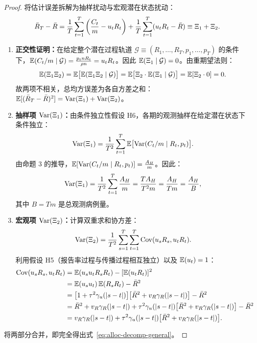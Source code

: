 \begin{proof}
将估计误差拆解为抽样扰动与宏观潜在状态扰动：
\begin{equation}
  \bar{R}_T - \bar{R} = \frac{1}{T}\sum_{t=1}^T \left( \frac{C_t}{m} - u_t R_t \right) + \frac{1}{T}\sum_{t=1}^T (u_t R_t - \bar{R}) \equiv \Xi_1 + \Xi_2.
\end{equation}
\begin{enumerate}
  \item \textbf{正交性证明：}在给定整个潜在过程轨道 $\mathcal{G} \equiv (R_1, \dots, R_T, p_1, \dots, p_T)$ 的条件下，$\mathbb{E}(C_t / m \mid \mathcal{G}) = \frac{p_t n R_t}{\rho n} = u_t R_t$。因此 $\mathbb{E}(\Xi_1 \mid \mathcal{G}) = 0$。由重期望法则：
  \begin{equation}
    \mathbb{E}(\Xi_1 \Xi_2) = \mathbb{E}\big[ \mathbb{E}(\Xi_1 \Xi_2 \mid \mathcal{G}) \big] = \mathbb{E}\big[ \Xi_2 \cdot \mathbb{E}(\Xi_1 \mid \mathcal{G}) \big] = \mathbb{E}[\Xi_2 \cdot 0] = 0.
  \end{equation}
  故两项不相关，总均方误差为各自方差之和：$\mathbb{E}[(\bar{R}_T - \bar{R})^2] = \mathrm{Var}(\Xi_1) + \mathrm{Var}(\Xi_2)$。
  \item \textbf{抽样项 $\mathrm{Var}(\Xi_1)$：}由条件独立性假设 H6，各期的观测抽样在给定潜在状态下条件独立：
  \begin{equation}
    \mathrm{Var}(\Xi_1) = \frac{1}{T^2}\sum_{t=1}^T \mathbb{E}\big[\mathrm{Var}(C_t / m \mid R_t, p_t)\big].
  \end{equation}
  由命题 3 的推导，$\mathbb{E}[\mathrm{Var}(C_t / m \mid R_t, p_t)] = \frac{A_H}{m}$。因此：
  \begin{equation}
    \mathrm{Var}(\Xi_1) = \frac{1}{T^2} \sum_{t=1}^T \frac{A_H}{m} = \frac{T A_H}{T^2 m} = \frac{A_H}{Tm} = \frac{A_H}{B},
  \end{equation}
  其中 $B = Tm$ 是总观测病例量。
  \item \textbf{宏观项 $\mathrm{Var}(\Xi_2)$：}计算双重求和协方差：
  \begin{equation}
    \mathrm{Var}(\Xi_2) = \frac{1}{T^2}\sum_{s=1}^T \sum_{t=1}^T \mathrm{Cov}(u_s R_s, u_t R_t).
  \end{equation}
  利用假设 H5（报告率过程与传播过程相互独立）以及 $\mathbb{E}(u_t) = 1$：
  \begin{align}
    \mathrm{Cov}(u_s R_s, u_t R_t) &= \mathbb{E}(u_s u_t R_s R_t) - [\mathbb{E}(u_t R_t)]^2 \nonumber \\
    &= \mathbb{E}(u_s u_t) \, \mathbb{E}(R_s R_t) - \bar{R}^2 \nonumber \\
    &= \big[ 1 + \tau^2 \gamma_u(|s-t|) \big] \big[ \bar{R}^2 + v_R \gamma_R(|s-t|) \big] - \bar{R}^2 \nonumber \\
    &= \bar{R}^2 + v_R \gamma_R(|s-t|) + \tau^2 \gamma_u(|s-t|)\big[\bar{R}^2 + v_R \gamma_R(|s-t|)\big] - \bar{R}^2 \nonumber \\
    &= v_R \gamma_R(|s-t|) + \tau^2 \gamma_u(|s-t|)\big[\bar{R}^2 + v_R \gamma_R(|s-t|)\big].
  \end{align}
\end{enumerate}
将两部分合并，即完全得出式~\eqref{eq:alloc-decomp-general}。
\end{proof}

